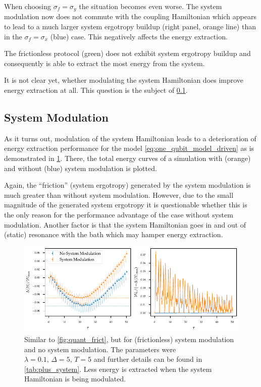 When choosing \(σ_{f}=σ_{y}\) the situation becomes even worse. The
system modulation now does not commute with the coupling Hamiltonian
which appears to lead to a much larger system ergotropy buildup (right
panel, orange line) than in the \(σ_{f}=σ_{x}\) (blue) case.  This
negatively affects the energy extraction.

The frictionless protocol (green) does not exhibit system ergotropy
buildup and consequently is able to extract the most energy from the
system.

It is not clear yet, whether modulating the system Hamiltonian does
improve energy extraction at all. This question is the subject of
\cref{sec:sys_mod_v_no_sys_mod}.

\subsection{System Modulation}
\label{sec:sys_mod_v_no_sys_mod}
As it turns out, modulation of the system Hamiltonian leads to a
deterioration of energy extraction performance for the model
\cref{eq:one_qubit_model_driven} as is demonstrated in
\cref{fig:quant_frict_sys_no_sys}. There, the total energy curves of a
simulation with (orange) and without (blue) system modulation is
plotted.

Again, the ``friction'' (system ergotropy) generated by the system
modulation is much greater than without system modulation. However,
due to the small magnitude of the generated system ergotropy it is
questionable whether this is the only reason for the performance
advantage of the case without system modulation. Another factor is
that the system Hamiltonian goes in and out of (static) resonance with
the bath which may hamper energy extraction.
\begin{figure}[htp]
  \centering
  \includegraphics{figs/one_bath_mod/system_vs_no_system}
  \caption{\label{fig:quant_frict_sys_no_sys} Similar to
    \cref{fig:quant_frict}, but for (frictionless) system modulation
    and no system modulation. The parameters were
    \(λ=0.1,\, Δ=5,\, T=5\) and further details can be found in
    \cref{tab:plus_system}. Less energy is extracted when the system
    Hamiltonian is being modulated.}
\end{figure}

